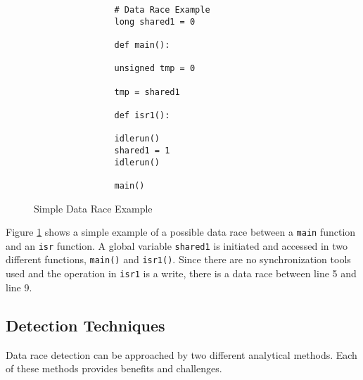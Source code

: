 \documentclass[
fancyheadings, %
%
%
]{stsreprt}
\begin{document}
{		\begin{figure}[H]
			\begin{lstlisting}
				# Data Race Example
				long shared1 = 0
				
				def main():
				
				unsigned tmp = 0
				
				tmp = shared1
				
				def isr1():
				
				idlerun()
				shared1 = 1
				idlerun()
				
				main()
			\end{lstlisting}
			\caption{Simple Data Race Example}
			\label{raceexample}
		\end{figure}	
		
		Figure \ref{raceexample} shows a simple example of a possible data race between a \texttt{main} function and an \texttt{isr} function. A global variable \texttt{shared1} is initiated and accessed in two different functions, \texttt{main()} and \texttt{isr1()}. Since there are no synchronization tools used and the operation in \texttt{isr1} is a write, there is a data race between line 5 and line 9.
		
		\subsection{Detection Techniques}
		
		Data race detection can be approached by two different analytical methods. Each of these methods provides benefits and challenges.
		
}
\end{document}
